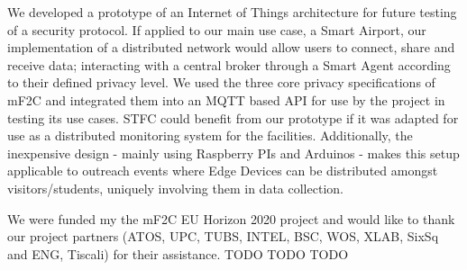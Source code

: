 We developed a prototype of an Internet of Things architecture for future testing of a security protocol. If applied to our main use case, a Smart Airport, our implementation of a distributed network would allow users to connect, share and receive data; interacting with a central broker through a Smart Agent according to their defined privacy level. We used the three core privacy specifications of mF2C and integrated them into an MQTT based API for use by the project in testing its use cases. STFC could benefit from our prototype if it was adapted for use as a distributed monitoring system for the facilities. Additionally, the inexpensive design - mainly using Raspberry PIs and Arduinos - makes this setup applicable to outreach events where Edge Devices can be distributed amongst visitors/students, uniquely involving them in data collection.

We were funded my the mF2C EU Horizon 2020 project and would like to thank our project partners (ATOS, UPC, TUBS, INTEL, BSC, WOS, XLAB, SixSq and ENG, Tiscali) for their assistance. TODO TODO TODO 
